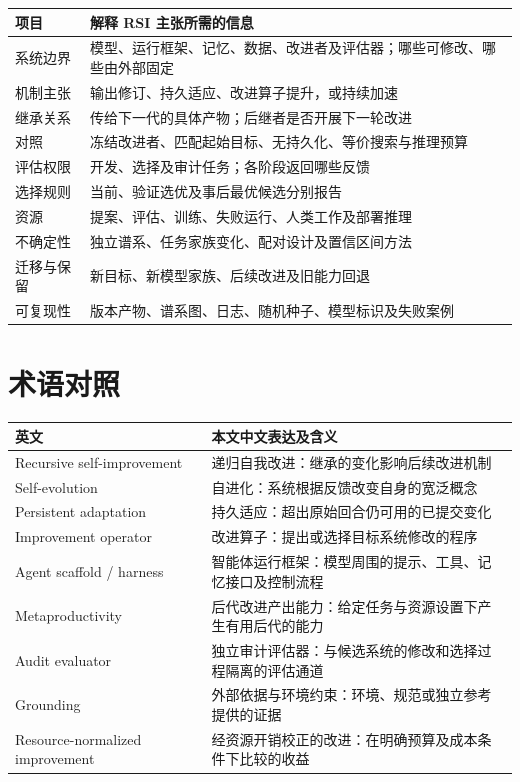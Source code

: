 \documentclass[11pt,,]{article}
\begin{document}
\begin{longtable}[]{@{}ll@{}}
\toprule
项目 & 解释 RSI 主张所需的信息\tabularnewline
\midrule
\endhead
系统边界 &
模型、运行框架、记忆、数据、改进者及评估器；哪些可修改、哪些由外部固定\tabularnewline
机制主张 & 输出修订、持久适应、改进算子提升，或持续加速\tabularnewline
继承关系 & 传给下一代的具体产物；后继者是否开展下一轮改进\tabularnewline
对照 &
冻结改进者、匹配起始目标、无持久化、等价搜索与推理预算\tabularnewline
评估权限 & 开发、选择及审计任务；各阶段返回哪些反馈\tabularnewline
选择规则 & 当前、验证选优及事后最优候选分别报告\tabularnewline
资源 & 提案、评估、训练、失败运行、人类工作及部署推理\tabularnewline
不确定性 & 独立谱系、任务家族变化、配对设计及置信区间方法\tabularnewline
迁移与保留 & 新目标、新模型家族、后续改进及旧能力回退\tabularnewline
可复现性 &
版本产物、谱系图、日志、随机种子、模型标识及失败案例\tabularnewline
\bottomrule
\end{longtable}


\hypertarget{ux672fux8bedux5bf9ux7167}{%
\section{术语对照}\label{ux672fux8bedux5bf9ux7167}}

\begin{longtable}[]{@{}ll@{}}
\toprule
英文 & 本文中文表达及含义\tabularnewline
\midrule
\endhead
Recursive self-improvement &
递归自我改进：继承的变化影响后续改进机制\tabularnewline
Self-evolution & 自进化：系统根据反馈改变自身的宽泛概念\tabularnewline
Persistent adaptation &
持久适应：超出原始回合仍可用的已提交变化\tabularnewline
Improvement operator &
改进算子：提出或选择目标系统修改的程序\tabularnewline
Agent scaffold / harness &
智能体运行框架：模型周围的提示、工具、记忆接口及控制流程\tabularnewline
Metaproductivity &
后代改进产出能力：给定任务与资源设置下产生有用后代的能力\tabularnewline
Audit evaluator &
独立审计评估器：与候选系统的修改和选择过程隔离的评估通道\tabularnewline
Grounding &
外部依据与环境约束：环境、规范或独立参考提供的证据\tabularnewline
Resource-normalized improvement &
经资源开销校正的改进：在明确预算及成本条件下比较的收益\tabularnewline
\bottomrule
\end{longtable}

\clearpage

\end{document}
